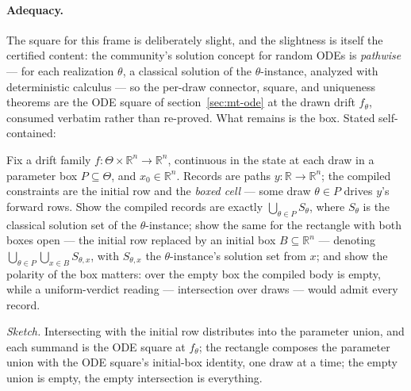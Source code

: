 \paragraph{Adequacy.} The square for this frame is deliberately
slight, and the slightness is itself the certified content: the
community's solution concept for random ODEs is \emph{pathwise} ---
for each realization $\theta$, a classical solution of the
$\theta$-instance, analyzed with deterministic calculus
\cite{han-kloeden-2017} --- so the per-draw connector, square, and
uniqueness theorems are the ODE square of
section~\ref{sec:mt-ode} at the drawn drift $f_\theta$, consumed
verbatim rather than re-proved. What remains is the box. Stated
self-contained:

\begin{problem}
\label{prob:mt-rode}
Fix a drift family $f : \Theta \times \mathbb{R}^n
\to \mathbb{R}^n$, continuous in the state at each draw in a
parameter box $P \subseteq \Theta$, and $x_0 \in \mathbb{R}^n$.
Records are paths $y : \mathbb{R} \to \mathbb{R}^n$; the compiled
constraints are the initial row and the \emph{boxed cell} --- some
draw $\theta \in P$ drives $y$'s forward rows. Show the compiled
records are exactly $\bigcup_{\theta \in P} S_\theta$, where
$S_\theta$ is the classical solution set of the $\theta$-instance;
show the same for the rectangle with both boxes open --- the initial
row replaced by an initial box $B \subseteq \mathbb{R}^n$ ---
denoting $\bigcup_{\theta \in P} \bigcup_{x \in B} S_{\theta,x}$,
with $S_{\theta,x}$ the $\theta$-instance's solution set from
$x$; and show
the polarity of the box matters: over the empty box the compiled
body is empty, while a uniform-verdict reading --- intersection over
draws --- would admit every record.
\end{problem}

\emph{Sketch.} Intersecting with the initial row distributes into
the parameter union, and each summand is the ODE square at
$f_\theta$; the rectangle composes the parameter union with the ODE
square's initial-box identity, one draw at a time; the empty union
is empty, the empty intersection is everything.

